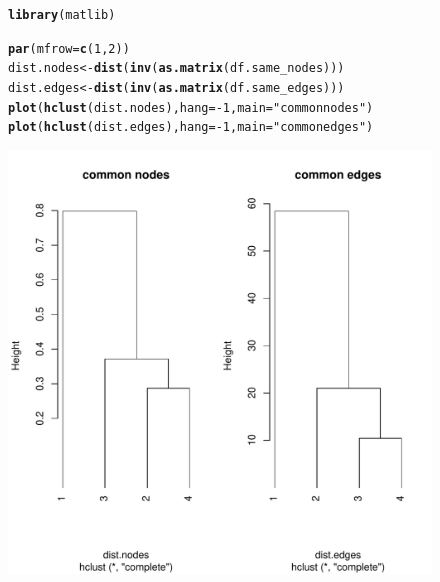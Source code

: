 \documentclass[article]{jss}\usepackage[]{graphicx}\usepackage[]{color}
\makeatletter
\def\maxwidth{ %
  \ifdim\Gin@nat@width>\linewidth
    \linewidth
  \else
    \Gin@nat@width
  \fi
}
\newcommand{\hlnum}[1]{\textcolor[rgb]{0.686,0.059,0.569}{#1}}%
\newcommand{\hlstr}[1]{\textcolor[rgb]{0.192,0.494,0.8}{#1}}%
\newcommand{\hlopt}[1]{\textcolor[rgb]{0,0,0}{#1}}%
\newcommand{\hlstd}[1]{\textcolor[rgb]{0.345,0.345,0.345}{#1}}%
\newcommand{\hlkwb}[1]{\textcolor[rgb]{0.69,0.353,0.396}{#1}}%
\newcommand{\hlkwc}[1]{\textcolor[rgb]{0.333,0.667,0.333}{#1}}%
\newcommand{\hlkwd}[1]{\textcolor[rgb]{0.737,0.353,0.396}{\textbf{#1}}}%
\newenvironment{kframe}{%
 \def\at@end@of@kframe{}%
 \ifinner\ifhmode%
  \def\at@end@of@kframe{\end{minipage}}%
  \begin{minipage}{\columnwidth}%
 \fi\fi%
 \def\FrameCommand##1{\hskip\@totalleftmargin \hskip-\fboxsep
 \colorbox{shadecolor}{##1}\hskip-\fboxsep
     \hskip-\linewidth \hskip-\@totalleftmargin \hskip\columnwidth}%
 \MakeFramed {\advance\hsize-\width
   \@totalleftmargin\z@ \linewidth\hsize
   \@setminipage}}%
 {\par\unskip\endMakeFramed%
 \at@end@of@kframe}
\newenvironment{knitrout}{}{} %
\makeatother
\begin{document}
\begin{figure}[H]
\begin{knitrout}
\color{fgcolor}\begin{kframe}
\begin{alltt}
\hlkwd{library}\hlstd{(matlib)}
\end{alltt}


{\ttfamily\noindent\color{warningcolor}{\#\# Warning: package 'matlib' was built under R version 3.6.3}}\begin{alltt}
\hlkwd{par}\hlstd{(}\hlkwc{mfrow}\hlstd{=}\hlkwd{c}\hlstd{(}\hlnum{1}\hlstd{,}\hlnum{2}\hlstd{))}
\hlstd{dist.nodes}  \hlkwb{<-} \hlkwd{dist}\hlstd{(}\hlkwd{inv}\hlstd{(}\hlkwd{as.matrix}\hlstd{(df.same_nodes)))}
\hlstd{dist.edges}  \hlkwb{<-} \hlkwd{dist}\hlstd{(}\hlkwd{inv}\hlstd{(}\hlkwd{as.matrix}\hlstd{(df.same_edges)))}
\hlkwd{plot}\hlstd{(}\hlkwd{hclust}\hlstd{(dist.nodes),} \hlkwc{hang} \hlstd{=} \hlopt{-}\hlnum{1}\hlstd{,} \hlkwc{main} \hlstd{=} \hlstr{"common nodes"}\hlstd{)}
\hlkwd{plot}\hlstd{(}\hlkwd{hclust}\hlstd{(dist.edges),} \hlkwc{hang} \hlstd{=} \hlopt{-}\hlnum{1}\hlstd{,} \hlkwc{main} \hlstd{=} \hlstr{"common edges"}\hlstd{)}
\end{alltt}
\end{kframe}
\includegraphics[width=\maxwidth]{figure/unnamed-chunk-15-1} 

\end{knitrout}
\end{figure}
\end{document}
